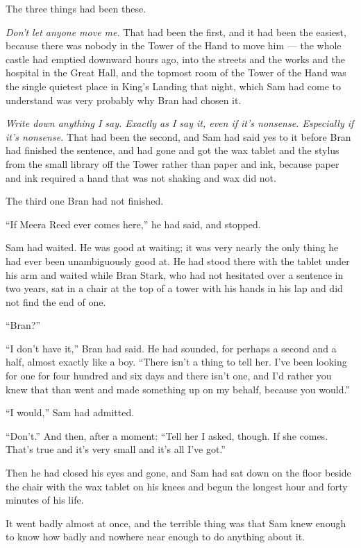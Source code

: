 The three things had been these.

\textit{Don’t let anyone move me.} That had been the first, and it had been the easiest, because there was nobody in the Tower of the Hand to move him — the whole castle had emptied downward hours ago, into the streets and the works and the hospital in the Great Hall, and the topmost room of the Tower of the Hand was the single quietest place in King’s Landing that night, which Sam had come to understand was very probably why Bran had chosen it.

\textit{Write down anything I say. Exactly as I say it, even if it’s nonsense. Especially if it’s nonsense.} That had been the second, and Sam had said yes to it before Bran had finished the sentence, and had gone and got the wax tablet and the stylus from the small library off the Tower rather than paper and ink, because paper and ink required a hand that was not shaking and wax did not.

The third one Bran had not finished.

“If Meera Reed ever comes here,” he had said, and stopped.

Sam had waited. He was good at waiting; it was very nearly the only thing he had ever been unambiguously good at. He had stood there with the tablet under his arm and waited while Bran Stark, who had not hesitated over a sentence in two years, sat in a chair at the top of a tower with his hands in his lap and did not find the end of one.

“Bran?”

“I don’t have it,” Bran had said. He had sounded, for perhaps a second and a half, almost exactly like a boy. “There isn’t a thing to tell her. I’ve been looking for one for four hundred and six days and there isn’t one, and I’d rather you knew that than went and made something up on my behalf, because you would.”

“I would,” Sam had admitted.

“Don’t.” And then, after a moment: “Tell her I asked, though. If she comes. That’s true and it’s very small and it’s all I’ve got.”

Then he had closed his eyes and gone, and Sam had sat down on the floor beside the chair with the wax tablet on his knees and begun the longest hour and forty minutes of his life.

\sceneBreak

It went badly almost at once, and the terrible thing was that Sam knew enough to know how badly and nowhere near enough to do anything about it.

